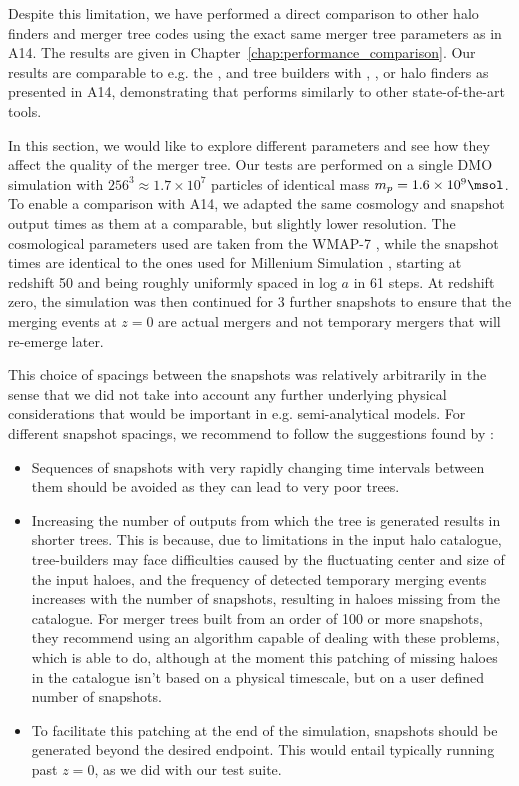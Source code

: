 Despite this limitation, we have performed a direct comparison to
other halo finders and merger tree codes using the exact same merger
tree parameters as in A14. The results are
given in Chapter~\ref{chap:performance_comparison}.  Our results are
comparable to e.g. the ,  and
 tree builders with , ,
or  halo finders as presented in A14, demonstrating that
\acacia performs similarly to other state-of-the-art tools.


In this section, we would like to explore different parameters and see how they affect the quality
of the merger tree.  Our tests are performed on a single DMO simulation with $256^3 \approx
1.7\times 10^7$ particles of identical mass $m_p = 1.6\times 10^9\msol$. To enable a comparison
with
A14, we adapted the same cosmology and snapshot output times as them at a comparable, but slightly
lower resolution. The cosmological parameters used are taken from the WMAP-7
\citep{komatsuSevenYearWilkinsonMicrowave2011}, while the snapshot times are identical to the ones
used for Millenium Simulation \citep{springelSimulationsFormationEvolution2005a}, starting at
redshift 50 and being roughly uniformly spaced in log $a$ in 61 steps. At redshift zero, the
simulation was then continued for 3 further snapshots to ensure that the merging events at $z = 0$
are actual mergers and not temporary mergers that will re-emerge later.

This choice of spacings between the snapshots was relatively arbitrarily in the sense that we did
not take into account any further underlying physical considerations that would be important in e.g.
semi-analytical models. For different snapshot spacings, we recommend to follow the suggestions
found by \citet{SUSSING_CONVERGENCE}:
\begin{itemize}
\item  Sequences of snapshots with very rapidly changing time intervals
between them should be avoided as they can lead to very poor trees.
\item  Increasing the number of outputs from which the tree is generated
results in shorter trees. This is because, due to limitations in the input halo
catalogue, tree-builders may face difficulties caused by the fluctuating center
and size of the input haloes, and the frequency of detected temporary merging
events increases with the number of snapshots, resulting in haloes missing from
the catalogue. For merger trees built from
an order of 100 or more snapshots, they recommend using an algorithm capable of
dealing with these problems, which \acacia is able to do, although at the
moment this patching of missing haloes in the catalogue isn't based on a physical
timescale, but on a user defined number of snapshots.
\item  To facilitate this patching at the end of the simulation, snapshots should
be generated beyond the desired endpoint. This would entail typically running past
$z = 0$, as we did with our test suite.
\end{itemize}

